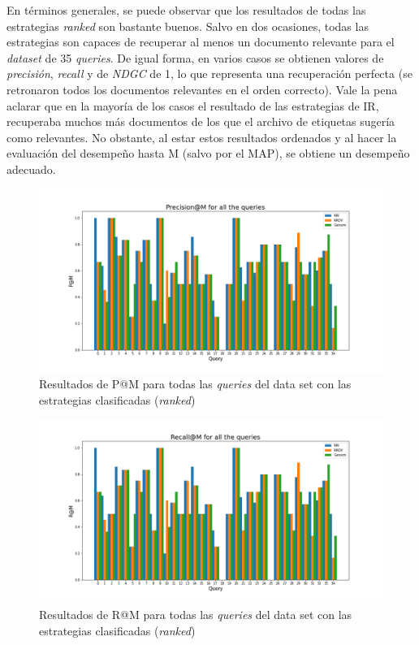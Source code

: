 En términos generales, se puede observar que los resultados de todas las estrategias \textit{ranked} son bastante buenos. Salvo en dos ocasiones, todas las estrategias son capaces de recuperar al menos un documento relevante para el \textit{dataset} de 35 \textit{queries}. De igual forma, en varios casos se obtienen valores de \textit{precisión}, \textit{recall} y de \textit{NDGC} de 1, lo que representa una recuperación perfecta (se retronaron todos los documentos relevantes en el orden correcto). Vale la pena aclarar que en la mayoría de los casos el resultado de las estrategias de IR, recuperaba muchos más documentos de los que el archivo de etiquetas sugería como relevantes. No obstante, al estar estos resultados ordenados y al hacer la evaluación del desempeño hasta M (salvo por el MAP), se obtiene un desempeño adecuado. 

\begin{figure}[H]
    \centering
    \includegraphics[width=\textwidth]{doc/images/P@M_Ranked.png}
    \caption{Resultados de P@M para todas las \textit{queries} del data set con las estrategias clasificadas (\textit{ranked})}
    \label{fig:rankedP}
\end{figure}

\begin{figure}[H]
    \centering
    \includegraphics[width=\textwidth]{doc/images/R@M_Ranked.png}
    \caption{Resultados de R@M para todas las \textit{queries} del data set con las estrategias clasificadas (\textit{ranked})}
    \label{fig:rankedR}
\end{figure}


